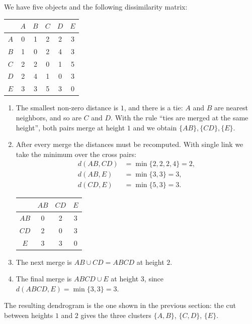 \begin{example}
We have five objects and the following dissimilarity matrix:
\begin{center}
\begin{tabular}{@{}c|ccccc@{}}
 & $A$ & $B$ & $C$ & $D$ & $E$ \\
\midrule
$A$ & 0 & 1 & 2 & 2 & 3 \\
$B$ & 1 & 0 & 2 & 4 & 3 \\
$C$ & 2 & 2 & 0 & 1 & 5 \\
$D$ & 2 & 4 & 1 & 0 & 3 \\
$E$ & 3 & 3 & 5 & 3 & 0 \\
\end{tabular}
\end{center}
\begin{enumerate}
  \item The smallest non-zero distance is $1$, and there is a tie: $A$ and $B$ are nearest neighbors, and so are $C$ and $D$. With the rule ``ties are merged at the same height'', both pairs merge at height $1$ and we obtain $\{AB\}, \{CD\}, \{E\}$.
  \item After every merge the distances must be recomputed. With single link we take the minimum over the cross pairs:
  \[
    \begin{aligned}
      d(AB, CD) &= \min\{2, 2, 2, 4\} = 2, \\
      d(AB, E) &= \min\{3, 3\} = 3, \\
      d(CD, E) &= \min\{5, 3\} = 3.
    \end{aligned}
  \]
  \begin{center}
  \begin{tabular}{@{}c|ccc@{}}
   & $AB$ & $CD$ & $E$ \\
  \midrule
  $AB$ & 0 & 2 & 3 \\
  $CD$ & 2 & 0 & 3 \\
  $E$ & 3 & 3 & 0 \\
  \end{tabular}
  \end{center}
  \item The next merge is $AB \cup CD = ABCD$ at height $2$.
  \item The final merge is $ABCD \cup E$ at height $3$, since $d(ABCD, E) = \min\{3, 3\} = 3$.
\end{enumerate}
The resulting dendrogram is the one shown in the previous section: the cut between heights $1$ and $2$ gives the three clusters $\{A,B\}$, $\{C,D\}$, $\{E\}$.
\end{example}

